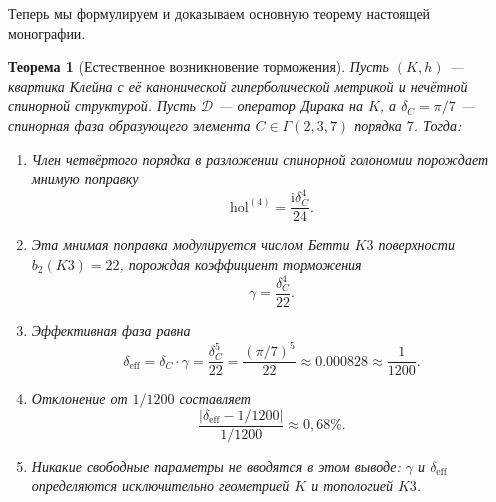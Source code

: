 \documentclass[12pt,a4paper]{article}
\newtheorem{theorem}{Теорема}[section]
\theoremstyle{definition}
\theoremstyle{remark}
\newcommand{\hol}{\mathrm{hol}}
\newcommand{\cD}{\mathcal{D}}
\newcommand{\ii}{\mathrm{i}}
\begin{document}
Теперь мы формулируем и доказываем основную теорему настоящей монографии.

\begin{theorem}[Естественное возникновение торможения]
\label{thm:main}
Пусть $(K, h)$ --- квартика Клейна с её канонической гиперболической метрикой и нечётной спинорной структурой. Пусть $\cD$ --- оператор Дирака на $K$, а $\delta_C = \pi/7$ --- спинорная фаза образующего элемента $C \in \Gamma(2,3,7)$ порядка $7$. Тогда:
\begin{enumerate}[label=(\roman*)]
\item Член четвёртого порядка в разложении спинорной голономии порождает мнимую поправку
\begin{equation}
\hol^{(4)} = \frac{\ii \delta_C^4}{24}.
\end{equation}
\item Эта мнимая поправка модулируется числом Бетти $K3$ поверхности $b_2(K3) = 22$, порождая коэффициент торможения
\begin{equation}
\gamma = \frac{\delta_C^4}{22}.
\end{equation}
\item Эффективная фаза равна
\begin{equation}
\delta_{\mathrm{eff}} = \delta_C \cdot \gamma = \frac{\delta_C^5}{22} = \frac{(\pi/7)^5}{22} \approx 0.000828 \approx \frac{1}{1200}.
\end{equation}
\item Отклонение от $1/1200$ составляет
\begin{equation}
\frac{|\delta_{\mathrm{eff}} - 1/1200|}{1/1200} \approx 0{,}68\%.
\end{equation}
\item Никакие свободные параметры не вводятся в этом выводе: $\gamma$ и $\delta_{\mathrm{eff}}$ определяются исключительно геометрией $K$ и топологией $K3$.
\end{enumerate}
\end{theorem}
\end{document}
